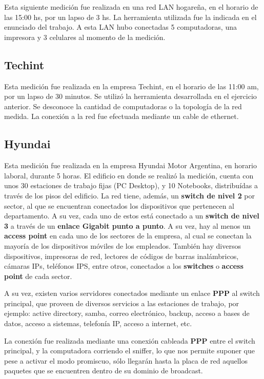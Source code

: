 \documentclass[final,inline,a4paper,narroweqnarray]{ieee}
\begin{document}
  Esta siguiente medición fue realizada en una red LAN hogareña, en el
  horario de las 15:00 hs, por un lapso de 3 hs. La herramienta
  utilizada fue la indicada en el enunciado del trabajo. A esta LAN
  hubo conectadas 5 computadoras, una impresora y 3 celulares al
  momento de la medición.

\subsection{Techint}

  Esta medición fue realizada en la empresa Techint, en el horario de
  las 11:00 am, por un lapso de 30 minutos. Se utilizó la herramienta
  desarrollada en el ejercicio anterior. Se desconoce la cantidad de
  computadoras o la topología de la red medida. La conexión a la red
  fue efectuada mediante un cable de ethernet.


\subsection{Hyundai}

  Esta medición fue realizada en la empresa Hyundai Motor Argentina,
  en horario laboral, durante 5 horas. El edificio en donde se realizó
  la medición, cuenta con unos 30 estaciones de trabajo fijas (PC
  Desktop), y 10 Notebooks, distribuídas a través de los pisos del
  edificio. La red tiene, además, un \textbf{switch de nivel 2} por
  sector, al que se encuentran conectados los dispositivos que
  pertenecen al departamento. A su vez, cada uno de estos está
  conectado a un \textbf{switch de nivel 3} a través de un
  \textbf{enlace Gigabit punto a punto}. A su vez, hay al menos un
  \textbf{access point} en cada uno de los sectores de la empresa, al
  cual se conectan la mayoría de los dispositivos móviles de los
  empleados. También hay diversos dispositivos, impresoras de red,
  lectores de códigos de barras inalámbricos, cámaras IPs, teléfonos
  IPS, entre otros, conectados a los
  \textbf{switches} o \textbf{access point} de cada sector.

  A su vez, existen varios servidores conectados mediante un enlace
  \textbf{PPP} al switch principal, que proveen de diversos servicios a las
  estaciones de trabajo, por ejemplo: active directory, samba, correo
  electrónico, backup, acceso a bases de datos, acceso a sistemas,
  telefonía IP, acceso a internet, etc.

  La conexión fue realizada mediante una conexión cableada
  \textbf{PPP} entre el switch principal, y la computadora corriendo
  el sniffer, lo que nos permite suponer que pese a activar el modo
  promiscuo, sólo llegarán hasta la placa de red aquellos paquetes que
  se encuentren dentro de su dominio de broadcast.
\end{document}
